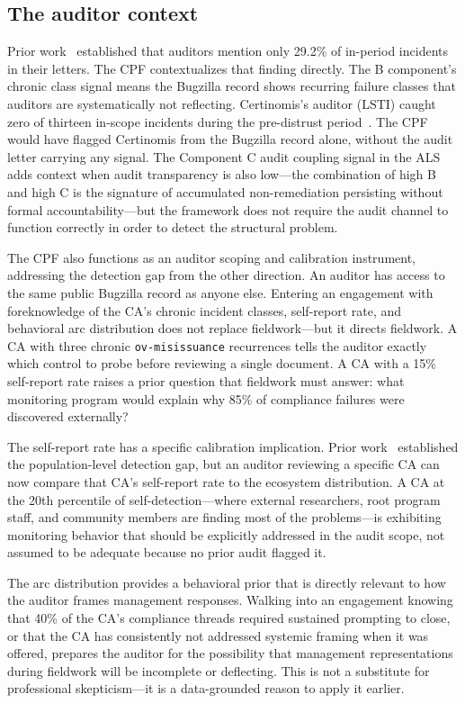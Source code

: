 \documentclass[10pt,twocolumn,letterpaper]{article}
\begin{document}
\subsection{The auditor context}

Prior work~\cite{p1} established that auditors mention only 29.2\% of in-period incidents
in their letters. The CPF contextualizes that finding directly. The B component's chronic
class signal means the Bugzilla record shows recurring failure classes that auditors are
systematically not reflecting. Certinomis's auditor (LSTI) caught zero of thirteen
in-scope incidents during the pre-distrust period~\cite{p1}. The CPF would have flagged
Certinomis from the Bugzilla record alone, without the audit letter carrying any signal.
The Component C audit coupling signal in the ALS adds context when audit transparency is
also low---the combination of high B and high C is the signature of accumulated
non-remediation persisting without formal accountability---but the framework does not
require the audit channel to function correctly in order to detect the structural problem.

The CPF also functions as an auditor scoping and calibration instrument, addressing the
detection gap from the other direction. An auditor has access to the same public Bugzilla
record as anyone else. Entering an engagement with foreknowledge of the CA's chronic
incident classes, self-report rate, and behavioral arc distribution does not replace
fieldwork---but it directs fieldwork. A CA with three chronic \texttt{ov-misissuance}
recurrences tells the auditor exactly which control to probe before reviewing a single
document. A CA with a 15\% self-report rate raises a prior question that fieldwork
must answer: what monitoring program would explain why 85\% of compliance failures
were discovered externally?

The self-report rate has a specific calibration implication. Prior work~\cite{p1}
established the population-level detection gap, but an auditor reviewing a specific CA
can now compare that CA's self-report rate to the ecosystem distribution. A CA at the
20th percentile of self-detection---where external researchers, root program staff, and
community members are finding most of the problems---is exhibiting monitoring behavior
that should be explicitly addressed in the audit scope, not assumed to be adequate
because no prior audit flagged it.

The arc distribution provides a behavioral prior that is directly relevant to how
the auditor frames management responses. Walking into an engagement knowing that 40\%
of the CA's compliance threads required sustained prompting to close, or that the CA
has consistently not addressed systemic framing when it was offered, prepares the
auditor for the possibility that management representations during fieldwork will be
incomplete or deflecting. This is not a substitute for professional skepticism---it is
a data-grounded reason to apply it earlier.
\end{document}
